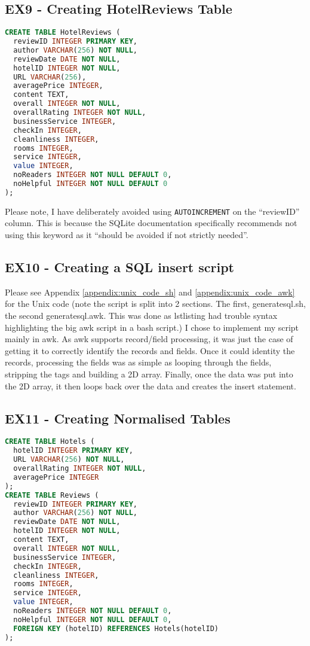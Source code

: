 \documentclass[a4paper]{article}
\begin{document}
\subsection{EX9 - Creating HotelReviews Table}
\begin{lstlisting}[language=SQL, style=default]
CREATE TABLE HotelReviews (
  reviewID INTEGER PRIMARY KEY,
  author VARCHAR(256) NOT NULL,
  reviewDate DATE NOT NULL,
  hotelID INTEGER NOT NULL,
  URL VARCHAR(256),
  averagePrice INTEGER,
  content TEXT,
  overall INTEGER NOT NULL,
  overallRating INTEGER NOT NULL,
  businessService INTEGER,
  checkIn INTEGER,
  cleanliness INTEGER,
  rooms INTEGER,
  service INTEGER,
  value INTEGER,
  noReaders INTEGER NOT NULL DEFAULT 0,
  noHelpful INTEGER NOT NULL DEFAULT 0
);
\end{lstlisting}
Please note, I have deliberately avoided using \texttt{AUTOINCREMENT} on the ``reviewID'' column.
This is because the SQLite documentation specifically recommends not using this keyword as it ``should be avoided if not strictly needed''.
\subsection{EX10 - Creating a SQL insert script}
Please see Appendix \ref{appendix:unix_code_sh} and \ref{appendix:unix_code_awk} for the Unix code (note the script is split into 2 sections.
The first, generatesql.sh, the second generatesql.awk.
This was done as lstlisting had trouble syntax highlighting the big awk script in a bash script.)
I chose to implement my script mainly in awk.
As awk supports record/field processing, it was just the case of getting it to correctly identify the records and fields.
Once it could identity the records, processing the fields was as simple as looping through the fields, stripping the tags and building a 2D array.
Finally, once the data was put into the 2D array, it then loops back over the data and creates the insert statement.

\subsection{EX11 - Creating Normalised Tables}
\begin{lstlisting}[language=SQL, style=default]
CREATE TABLE Hotels (
  hotelID INTEGER PRIMARY KEY,
  URL VARCHAR(256) NOT NULL,
  overallRating INTEGER NOT NULL,
  averagePrice INTEGER
);
CREATE TABLE Reviews (
  reviewID INTEGER PRIMARY KEY,
  author VARCHAR(256) NOT NULL,
  reviewDate DATE NOT NULL,
  hotelID INTEGER NOT NULL,
  content TEXT,
  overall INTEGER NOT NULL,
  businessService INTEGER,
  checkIn INTEGER,
  cleanliness INTEGER,
  rooms INTEGER,
  service INTEGER,
  value INTEGER,
  noReaders INTEGER NOT NULL DEFAULT 0,
  noHelpful INTEGER NOT NULL DEFAULT 0,
  FOREIGN KEY (hotelID) REFERENCES Hotels(hotelID)
);
\end{lstlisting}
\end{document}
